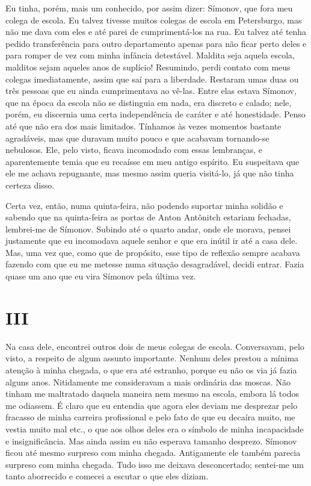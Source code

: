 Eu tinha, porém, mais um conhecido, por assim dizer: Símonov, que fora
meu colega de escola. Eu talvez tivesse muitos colegas de escola em
Petersburgo, mas não me dava com eles e até parei de cumprimentá-los na
rua. Eu talvez até tenha pedido transferência para outro departamento
apenas para não ficar perto deles e para romper de vez com minha
infância detestável. Maldita seja aquela escola, malditos sejam aqueles
anos de suplício! Resumindo, perdi contato com meus colegas
imediatamente, assim que saí para a liberdade. Restaram umas duas ou
três pessoas que eu ainda cumprimentava ao vê-las. Entre elas estava
Símonov, que na época da escola não se distinguia em nada, era discreto
e calado; nele, porém, eu discernia uma certa independência de caráter
e até honestidade. Penso até que não era dos mais limitados. Tínhamos
às vezes momentos bastante agradáveis, mas que duravam muito pouco e
que acabavam tornando-se nebulosos. Ele, pelo visto, ficava incomodado
com essas lembranças, e aparentemente temia que eu recaísse em meu
antigo espírito. Eu suspeitava que ele me achava repugnante, mas mesmo
assim queria visitá-lo, já que não tinha certeza disso.

Certa vez, então, numa quinta-feira, não podendo suportar minha solidão
e sabendo que na quinta-feira as portas de Anton Antônitch estariam
fechadas, lembrei-me de Símonov. Subindo até o quarto andar, onde ele
morava, pensei justamente que eu incomodava aquele senhor e que era
inútil ir até a casa dele. Mas, uma vez que, como que de propósito,
esse tipo de reflexão sempre acabava fazendo com que eu me metesse numa
situação desagradável, decidi entrar. Fazia quase um ano que eu vira
Símonov pela última vez.


\section{III}

Na casa dele, encontrei outros dois de meus colegas de escola.
Conversavam, pelo visto, a respeito de algum assunto importante. Nenhum
deles prestou a mínima atenção à minha chegada, o que era até estranho,
porque eu não os via já fazia alguns anos. Nitidamente me consideravam
a mais ordinária das moscas. Não tinham me maltratado daquela maneira
nem mesmo na escola, embora lá todos me odiassem. É claro que eu
entendia que agora eles deviam me desprezar pelo fracasso de minha
carreira profissional e pelo fato de que eu decaíra muito, me vestia
muito mal etc., o que aos olhos deles era o símbolo de minha
incapacidade e insignificância. Mas ainda assim eu não esperava tamanho
desprezo. Símonov ficou até mesmo surpreso com minha chegada.
Antigamente ele também parecia surpreso com minha chegada. Tudo isso me
deixava desconcertado; sentei-me um tanto aborrecido e comecei a
escutar o que eles diziam.

